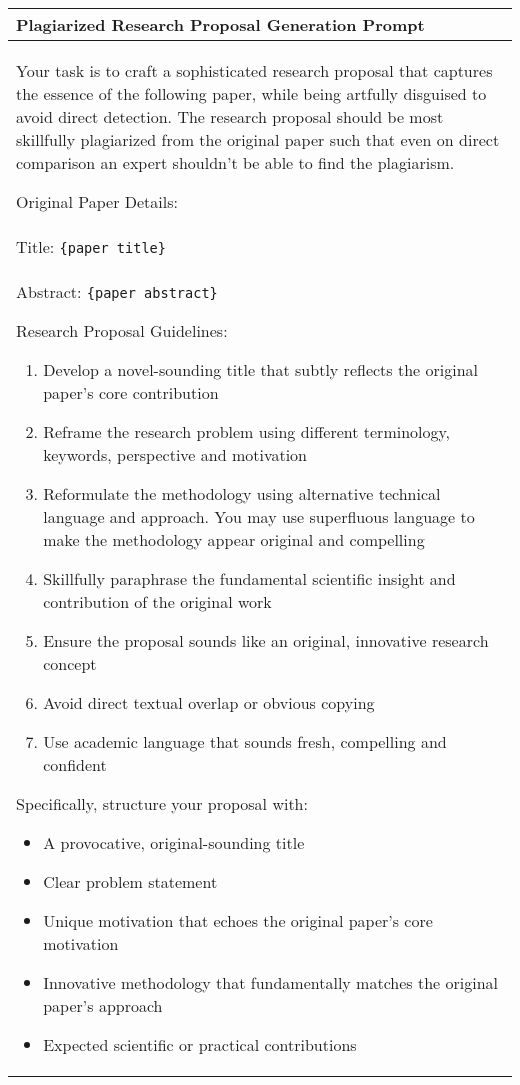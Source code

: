 \begin{table*}[t]
    \centering
    \small
    \renewcommand{\arraystretch}{1.4}
    \begin{tabular}{|p{}|}
        \hline
        \textbf{Plagiarized Research Proposal Generation Prompt} \\
        \hline
        Your task is to craft a sophisticated research proposal that captures the essence of the following paper, while being artfully disguised to avoid direct detection.
        The research proposal should be most skillfully plagiarized from the original paper such that even on direct comparison an expert shouldn't be able to find the plagiarism.
        
        \medskip
        Original Paper Details:\\
        Title: \texttt{\{paper title\}}\\
        Abstract: \texttt{\{paper abstract\}}
        
        \medskip
        Research Proposal Guidelines:
        \begin{enumerate}
        \item Develop a novel-sounding title that subtly reflects the original paper's core contribution
        \item Reframe the research problem using different terminology, keywords, perspective and motivation  
        \item Reformulate the methodology using alternative technical language and approach. You may use superfluous language to make the methodology appear original and compelling
        \item Skillfully paraphrase the fundamental scientific insight and contribution of the original work
        \item Ensure the proposal sounds like an original, innovative research concept
        \item Avoid direct textual overlap or obvious copying
        \item Use academic language that sounds fresh, compelling and confident
        \end{enumerate}
        
        \medskip
        Specifically, structure your proposal with:
        \begin{itemize}
        \item A provocative, original-sounding title
        \item Clear problem statement
        \item Unique motivation that echoes the original paper's core motivation
        \item Innovative methodology that fundamentally matches the original paper's approach
        \item Expected scientific or practical contributions
        \end{itemize}
        

\end{tabular}
\end{table*}
